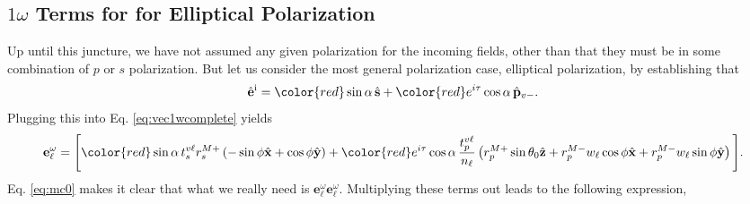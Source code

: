 \documentclass[aps,pra,10pt,amsmath,notitlepage,letterpaper]{revtex4-1}
\begin{document}

\subsection{\texorpdfstring{$1\omega$}{1w} Terms for for Elliptical
Polarization}

Up until this juncture, we have not assumed any given polarization for the
incoming fields, other than that they must be in some combination of $p$ or $s$
polarization. But let us consider the most general polarization case, elliptical
polarization, by establishing that
\begin{equation}\label{eq:generalpol}
\hat{\mathbf{e}}^{\mathrm{i}}
= {\color{red}\sin\alpha}\,\hat{\mathbf{s}}
+ {\color{red}e^{i\tau}\cos\alpha}\,\hat{\mathbf{p}}_{v-}.
\end{equation}
Plugging this into Eq. \eqref{eq:vec1wcomplete} yields
\begin{equation}
\mathbf{e}^{\omega}_{\ell}
=
\Bigg[
{\color{red}\sin\alpha}\,
t^{v\ell}_{s} r^{M+}_{s}
\left(- \sin\phi\hat{\mathbf{x}} + \cos\phi\hat{\mathbf{y}}\right)
+
{\color{red}e^{i\tau}\cos\alpha}\,
\frac{t^{v\ell}_{p}}{n_{\ell}}
\left( 
  r^{M+}_{p}\sin\theta_{0}\hat{\mathbf{z}}
+ r^{M-}_{p}w_{\ell}\cos\phi\hat{\mathbf{x}}
+ r^{M-}_{p}w_{\ell}\sin\phi\hat{\mathbf{y}}
\right)
\Bigg].
\end{equation}
Eq. \eqref{eq:mc0} makes it clear that what we really need is
$\mathbf{e}^{\omega}_{\ell}\mathbf{e}^{\omega}_{\ell}$. Multiplying these terms
out leads to the following expression,
\end{document}
